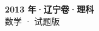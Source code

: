 \documentclass[zihao=-4, a4paper]{ctexart}
\begin{document}
\begin{center}
  {\Large\bfseries 2013 年·辽宁卷·理科}\\[4pt]
  {\large 数学 · 试题版}
\end{center}
\medskip
{}

\end{document}
